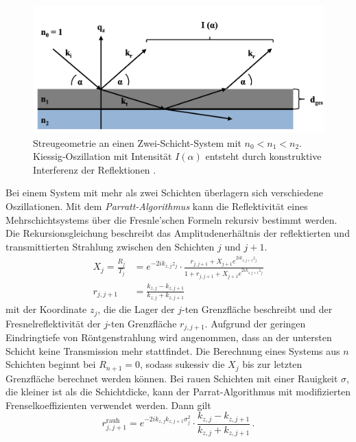 \begin{figure}
    \centering
    \includegraphics[width = \linewidth]{schichtdicke.png}
    \caption{Streugeometrie an einen Zwei-Schicht-System mit $n_0 < n_1 < n_2$. Kiessig-Oszillation 
    mit Intensität $I(\alpha)$ entsteht durch konstruktive Interferenz der Reflektionen \cite{ref:dissertation}.}
    \label{fig:schichtdicke}
\end{figure}
Bei einem System mit mehr als zwei Schichten überlagern sich verschiedene Oszillationen. Mit dem \textit{Parratt-Algorithmus}
kann die Reflektivität eines Mehrschichtsystems über die Fresnle'schen Formeln rekursiv bestimmt werden.
Die Rekursionsgleichung beschreibt das Amplitudenerhältnis der reflektierten und transmittierten Strahlung
zwischen den Schichten $j$ und $j+1$. 
\begin{align}
    X_j = \frac{R_j}{T_j} &= e^{-2 i k_{z,j}z_j} \cdot \frac{r_{j, j+1} + X_{j+1}e^{2 i k_{z,j+1}z_j}}{1+r_{j, j+1} + X_{j+1}e^{2 i k_{z,j+1}z_j}} \\
    r_{j, j+1} &= \frac{k_{z,j}-k_{z, j+1}}{k_{z,j}+k_{z, j+1}}
\end{align}
mit der Koordinate $z_j$, die die Lager der $j$-ten Grenzfläche beschreibt und der Fresnelreflektivität
der $j$-ten Grenzfläche $r_{j, j+1}$.
Aufgrund der geringen Eindringtiefe von Röntgenstrahlung wird angenommen, dass an der untersten Schicht 
keine Transmission mehr stattfindet.
Die Berechnung eines Systems aus $n$ Schichten beginnt bei $R_{n+1} = 0$, sodass sukessiv die $X_j$ bis zur 
letzten Grenzfläche berechnet werden können. 
Bei rauen Schichten mit einer Rauigkeit $\sigma$, die kleiner ist als die Schichtdicke, kann der Parrat-Algorithmus
mit modifizierten Frenselkoeffizienten verwendet werden. Dann gilt 
\begin{equation}
    r_{j, j+1}^\text{rauh} = e^{-2 i k_{z,j} k_{z, j+1} \sigma_j^2} \cdot \frac{k_{z,j}-k_{z, j+1}}{k_{z,j}+k_{z, j+1}} \, .
\end{equation}